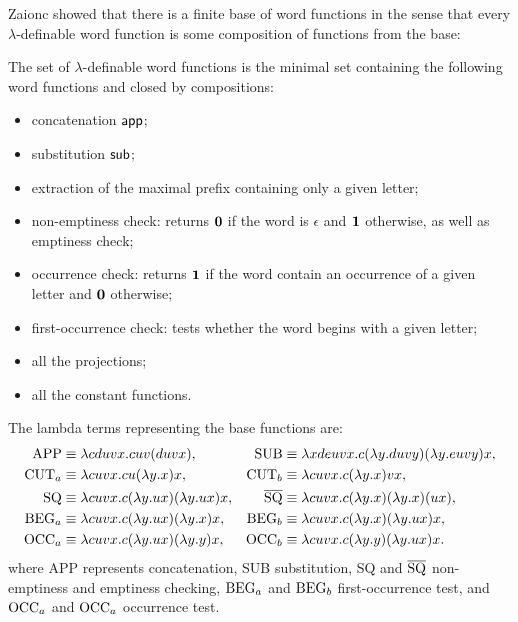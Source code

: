 Zaionc \cite{DBLP:journals/tcs/Zaionc87} showed that there is a
finite base of word functions in the sense that every
$\lambda$-definable word function is some composition of functions
from the base:
\begin{theorem}
The set of $\lambda$-definable word functions is the minimal set containing the following word functions and closed by compositions:
\begin{itemize}
  \item concatenation ${\sf app}$;
  \item substitution ${\sf sub}$;
  \item extraction of the maximal prefix containing only a given letter;
  \item non-emptiness check: returns $\mathbf{0}$ if the word is $\epsilon$ and $\mathbf{1}$ otherwise, as well as emptiness check;
  \item occurrence check: returns $\mathbf{1}$ if the word contain an occurrence of a given letter and $\mathbf{0}$ otherwise;
  \item first-occurrence check: tests whether the word begins with a given letter;
  \item all the projections;
  \item all the constant functions.
\end{itemize}
\end{theorem}
The lambda terms representing the base functions are:
\begin{align*}
  {\rm APP} &\equiv \lambda c d u v x.c u v(d u v x), & {\rm SUB} &\equiv \lambda x d e u v x.c(\lambda y.d u v y)(\lambda y . e u v y) x, \\
  {\rm CUT}_a &\equiv \lambda c u v x . c u (\lambda y.x) x, & {\rm CUT}_b &\equiv \lambda c u v x . c (\lambda y.x) v x, \\
  {\rm SQ} &\equiv \lambda c u v x . c (\lambda y.u x) (\lambda y.u x) x, & \overline{{\rm SQ}} &\equiv \lambda c u v x . c (\lambda y.x) (\lambda y.x) (u x), \\
  {\rm BEG}_a &\equiv \lambda c u v x . c (\lambda y.u x) (\lambda y.x) x, & {\rm BEG}_b &\equiv \lambda c u v x . c (\lambda y.x) (\lambda y.u x) x, \\
  {\rm OCC}_a &\equiv \lambda c u v x . c (\lambda y.u x) (\lambda y.y) x, & {\rm OCC}_b &\equiv \lambda c u v x . c (\lambda y.y) (\lambda y.u x) x.
\end{align*}
where {\rm APP} represents concatenation, {\rm SUB} substitution,
{\rm SQ} and $\overline{{\rm SQ}}$ non-emptiness and emptiness checking, ${\rm BEG}_a$ and
${\rm BEG}_b$ first-occurrence test, and ${\rm OCC}_a$ and ${\rm OCC}_a$ occurrence test.

